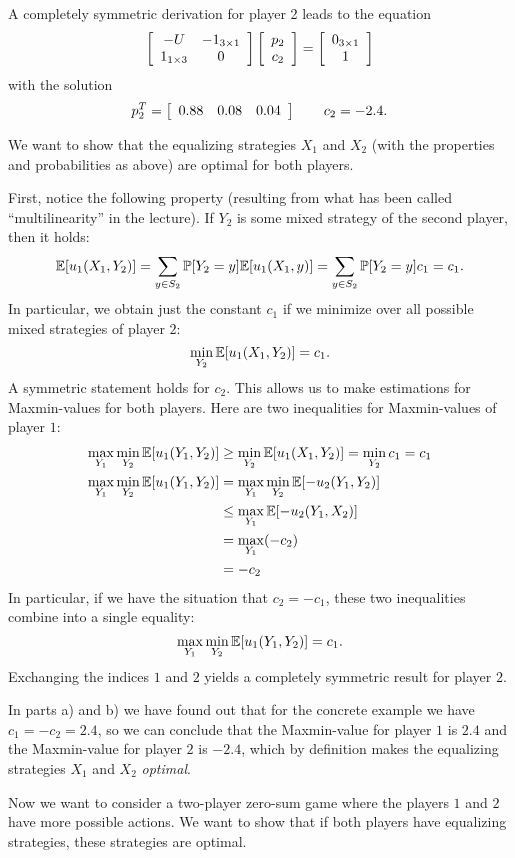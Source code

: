 \documentclass{scrartcl}
\begin{document}
 A completely symmetric derivation for player 2 
leads to the equation
\[
  \mat{cc}{
    -U & -1_{3\times 1} \\
    1_{1\times 3} & 0
  }
  \mat{c}{p_2 \\ c_2} = 
  \mat{c}{0_{3\times 1} \\ 1}
\]
with the solution 
\[
  p_2^T = \mat{ccc}{0.88 & 0.08 & 0.04} \qquad c_2 = -2.4.
\]

 We want to show that the equalizing strategies 
$X_1$ and $X_2$ (with the properties and probabilities as above) 
are optimal for both players.

First, notice the following property (resulting from what has been called
``multilinearity'' in the lecture). If $Y_2$ is some mixed strategy of the
second player, then it holds:
\[
  \E[u_1(X_1, Y_2)] = \sum_{y\in S_2}\P[Y_2 = y]\E[u_1(X_1,y)]
  = \sum_{y\in S_2}\P[Y_2 = y]c_1 = c_1.
\]
In particular, we obtain just the constant $c_1$ if we minimize over all
possible mixed strategies of player $2$:
\[
  \min_{Y_2} \E[u_1(X_1, Y_2)] = c_1.
\]
A symmetric statement holds for $c_2$. This allows us to make estimations for
Maxmin-values for both players. Here are two inequalities for Maxmin-values of
player $1$:
\begin{align*}
  \max_{Y_1} \min_{Y_2} \E[u_1(Y_1, Y_2)] 
    &\geq \min_{Y_2} \E[u_1(X_1, Y_2)] = \min_{Y_2} c_1 = c_1 \\
  \max_{Y_1}\min_{Y_2}\E[u_1(Y_1, Y_2)] 
    &= \max_{Y_1} \min_{Y_2} \E[-u_2(Y_1, Y_2)] \\
    &\leq \max_{Y_1} \E[-u_2(Y_1, X_2)] \\
    & = \max_{Y_1}(-c_2) \\
    & = -c_2
\end{align*}
In particular, if we have the situation that $c_2 = -c_1$, these two 
inequalities combine into a single equality:
\[
  \max_{Y_1} \min_{Y_2} \E[u_1(Y_1, Y_2)] = c_1.
\]
Exchanging the indices $1$ and $2$ yields a completely symmetric result for
player $2$. 

In parts a) and b) we have found out that for the concrete example we have
$c_1 = -c_2 = 2.4$, so we can conclude that the Maxmin-value for player $1$ is
$2.4$ and the Maxmin-value for player $2$ is $-2.4$, which by definition makes
the equalizing strategies $X_1$ and $X_2$ \emph{optimal}.

 Now we want to consider a two-player zero-sum game where 
the players $1$ and $2$ have more possible actions. We want to show that if 
both players have equalizing strategies, these strategies are optimal.
\end{document}
